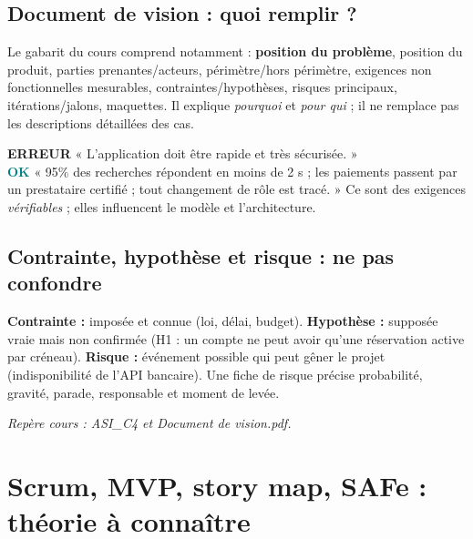\documentclass[10pt,a4paper]{article}
\newcommand{\good}{\textcolor{teal}{\textbf{OK}}}
\newcommand{\bad}{\textcolor{red!70!black}{\textbf{ERREUR}}}
\newcommand{\source}[1]{\par{\footnotesize\color{bodygray}\textit{Repère cours : #1}}}
\begin{document}
\subsection{Document de vision : quoi remplir ?}
Le gabarit du cours comprend notamment : \textbf{position du problème}, position du produit, parties prenantes/acteurs, périmètre/hors périmètre, exigences non fonctionnelles mesurables, contraintes/hypothèses, risques principaux, itérations/jalons, maquettes. Il explique \emph{pourquoi} et \emph{pour qui} ; il ne remplace pas les descriptions détaillées des cas.

\begin{exobox}
\bad{} « L'application doit être rapide et très sécurisée. »\\
\good{} « 95\% des recherches répondent en moins de 2 s ; les paiements passent par un prestataire certifié ; tout changement de rôle est tracé. » Ce sont des exigences \emph{vérifiables} ; elles influencent le modèle et l'architecture.
\end{exobox}
\subsection{Contrainte, hypothèse et risque : ne pas confondre}
\textbf{Contrainte :} imposée et connue (loi, délai, budget). \textbf{Hypothèse :} supposée vraie mais non confirmée (H1 : un compte ne peut avoir qu'une réservation active par créneau). \textbf{Risque :} événement possible qui peut gêner le projet (indisponibilité de l'API bancaire). Une fiche de risque précise probabilité, gravité, parade, responsable et moment de levée.
\source{ASI\_C4 et Document de vision.pdf.}

\section{Scrum, MVP, story map, SAFe : théorie à connaître}
\end{document}
